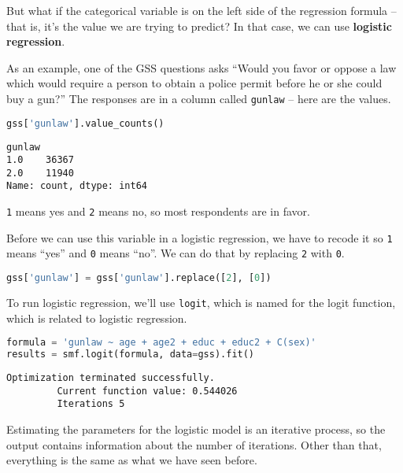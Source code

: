 But what if the categorical variable is on the left side of the
regression formula -- that is, it's the value we are trying to predict?
In that case, we can use \textbf{logistic regression}.

As an example, one of the GSS questions asks ``Would you favor or oppose
a law which would require a person to obtain a police permit before he
or she could buy a gun?'' The responses are in a column called
\passthrough{\lstinline!gunlaw!} -- here are the values.

\begin{lstlisting}[language=Python,style=source]
gss['gunlaw'].value_counts()
\end{lstlisting}

\begin{lstlisting}[style=output]
gunlaw
1.0    36367
2.0    11940
Name: count, dtype: int64
\end{lstlisting}

\passthrough{\lstinline!1!} means yes and \passthrough{\lstinline!2!}
means no, so most respondents are in favor.

Before we can use this variable in a logistic regression, we have to
recode it so \passthrough{\lstinline!1!} means ``yes'' and
\passthrough{\lstinline!0!} means ``no''. We can do that by replacing
\passthrough{\lstinline!2!} with \passthrough{\lstinline!0!}.

\begin{lstlisting}[language=Python,style=source]
gss['gunlaw'] = gss['gunlaw'].replace([2], [0])
\end{lstlisting}

To run logistic regression, we'll use \passthrough{\lstinline!logit!},
which is named for the logit function, which is related to logistic
regression.

\begin{lstlisting}[language=Python,style=source]
formula = 'gunlaw ~ age + age2 + educ + educ2 + C(sex)'
results = smf.logit(formula, data=gss).fit()
\end{lstlisting}

\begin{lstlisting}[style=output]
Optimization terminated successfully.
         Current function value: 0.544026
         Iterations 5
\end{lstlisting}

Estimating the parameters for the logistic model is an iterative
process, so the output contains information about the number of
iterations. Other than that, everything is the same as what we have seen
before.

